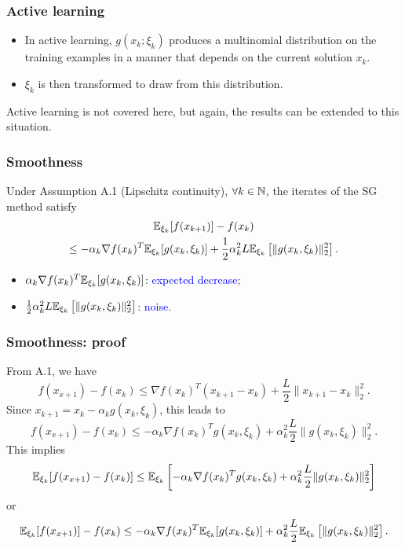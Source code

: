 \documentclass[usepdftitle=false, aspectratio=169]{beamer}
\begin{document}
\begin{frame}
\frametitle{Active learning}

\begin{itemize}
\item 
In active learning, $g(x_k; \xi_k)$ produces a multinomial
distribution on the training examples in a manner that depends on the current solution $x_k$.
\item
$\xi_k$ is then transformed to draw from this distribution.
\end{itemize}

Active learning is not covered here, but again, the results can be extended to this situation.

\end{frame}

\begin{frame}
\frametitle{Smoothness}

\begin{theorem}
Under Assumption A.1 (Lipschitz continuity), $\forall k \in {\mathbb{N}}$, the iterates of the SG method satisfy
\begin{multline*}
{\mathbb{E}}_{\xi_k}[f(x_{k+1})] - f(x_k)
\\ \leq
-\alpha_k \nabla f(x_k)^T{\mathbb{E}}_{\xi_k}[g(x_k,\xi_k)]
+\frac{1}{2} \alpha_k^2 L {\mathbb{E}}_{\xi_k} \left[ \| g(x_k, \xi_k )\|_2^2 \right].
\end{multline*}
\end{theorem}
\begin{itemize}
	\item $\alpha_k \nabla f(x_k)^T{\mathbb{E}}_{\xi_k}[g(x_k,\xi_k)]$: \textcolor{blue}{expected decrease};
	\item $\frac{1}{2} \alpha_k^2 L {\mathbb{E}}_{\xi_k} \left[ \| g(x_k, \xi_k )\|_2^2 \right]$: \textcolor{blue}{noise}.
\end{itemize}

\end{frame}

\begin{frame}
	\frametitle{Smoothness: proof}
	
	From A.1, we have
	$$
	f(x_{x+1}) - f(x_k) \leq \nabla f(x_k)^T (x_{k+1} - x_k) + \frac{L}{2} \| x_{k+1} - x_k \|^2_2.
	$$
	Since $x_{k+1} = x_k - \alpha_k g(x_k, \xi_k)$, this leads to
	$$
	f(x_{x+1}) - f(x_k) \leq - \alpha_k \nabla f(x_k)^T g(x_k, \xi_k) + \alpha_k^2 \frac{L}{2} \| g(x_k, \xi_k) \|^2_2.
	$$
	This implies
    $$
		{\mathbb{E}}_{\xi_k} [f(x_{x+1}) - f(x_k)] \leq {\mathbb{E}}_{\xi_k} \left[ - \alpha_k \nabla f(x_k)^T g(x_k, \xi_k) + \alpha_k^2 \frac{L}{2} \| g(x_k, \xi_k) \|^2_2 \right]
	$$
	or
	$$
		{\mathbb{E}}_{\xi_k} [f(x_{x+1})] - f(x_k) \leq - \alpha_k \nabla f(x_k)^T {\mathbb{E}}_{\xi_k} [ g(x_k, \xi_k) ] + \alpha_k^2 \frac{L}{2} {\mathbb{E}}_{\xi_k} \left[ \| g(x_k, \xi_k) \|^2_2 \right].	
	$$
	
	\begin{align*}
	\end{align*}
	
\end{frame}
\end{document}
